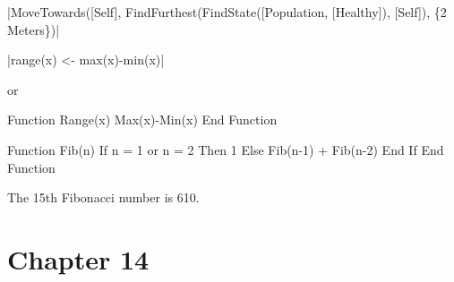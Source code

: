 \documentclass[]{memoir}
\newenvironment{Shaded}{}{}
\newcommand{\DecValTok}[1]{\textcolor[rgb]{0.25,0.63,0.44}{{#1}}}
\newcommand{\FunctionTok}[1]{\textcolor[rgb]{0.02,0.16,0.49}{{#1}}}
\newcommand{\NormalTok}[1]{{#1}}
\begin{document}
|\FunctionTok{MoveTowards}\NormalTok{([Self], }\FunctionTok{FindFurthest}\NormalTok{(}\FunctionTok{FindState}\NormalTok{([Population, [Healthy]), [Self]), \{}\DecValTok{2} \NormalTok{Meters\})}|


|\FunctionTok{range}\NormalTok{(x) <- }\FunctionTok{max}\NormalTok{(x)-}\FunctionTok{min}\NormalTok{(x)}|

or

\begin{Shaded}
\begin{Highlighting}[]
\NormalTok{Function }\FunctionTok{Range}\NormalTok{(x)}
    \FunctionTok{Max}\NormalTok{(x)-}\FunctionTok{Min}\NormalTok{(x)}
\NormalTok{End Function}
\end{Highlighting}
\end{Shaded}


\begin{Shaded}
\begin{Highlighting}[]
\NormalTok{Function }\FunctionTok{Fib}\NormalTok{(n)}
    \NormalTok{If n = }\DecValTok{1} \NormalTok{or n = }\DecValTok{2} \NormalTok{Then}
        \DecValTok{1}
    \NormalTok{Else}
        \FunctionTok{Fib}\NormalTok{(n}\DecValTok{-1}\NormalTok{) + }\FunctionTok{Fib}\NormalTok{(n}\DecValTok{-2}\NormalTok{)}
    \NormalTok{End If}
\NormalTok{End Function}
\end{Highlighting}
\end{Shaded}

The 15th Fibonacci number is 610.

\section{Chapter 14}

\end{document}
